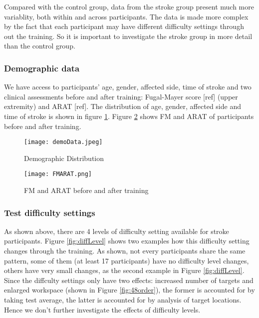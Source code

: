 Compared with the control group, data from the stroke group present much more variablity, both within and across participants. The data is made more complex by the fact that each participant may have different difficulty settings through out the training. So it is important to investigate the stroke group in more detail than the control group.

\subsubsection{Demographic data}

We have access to participants' age, gender, affected side, time of stroke and two clinical assessments before and after training: Fugal-Mayer score [ref] (upper extremity) and ARAT [ref]. The distribution of age, gender, affected side and time of stroke is shown in figure \ref{fig:demoData}. Figure \ref{fig:FMARAT} shows FM and ARAT of participants before and after training.

\begin{figure} %
	\texttt{[image: demoData.jpeg]}
	\centering
	\caption{Demographic Distribution}
	\medskip
	\small 
	\label{fig:demoData}
\end{figure}

\begin{figure} %
	\texttt{[image: FMARAT.png]}
	\centering
	\caption{FM and ARAT before and after training}
	\medskip
	\small 
	\label{fig:FMARAT}
\end{figure}

\subsubsection{Test difficulty settings}

As shown above, there are 4 levels of difficulty setting available for stroke participants. Figure \ref{fig:diffLevel} shows two examples how this difficulty setting changes through the training. As shown, not every participants share the same pattern, some of them (at least 17 participants) have no difficulty level changes, others have very small changes, as the second example in Figure \ref{fig:diffLevel}. Since the diffculty settings only have two effects: increased number of targets and enlarged workspace (shown in Figure \ref{fig:48order}), the former is accounted for by taking test average, the latter is accounted for by analysis of target locations. Hence we don't further investigate the effects of difficulty levels.

